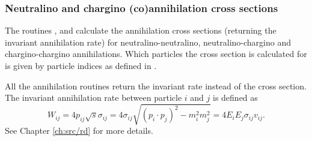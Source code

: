 \subsubsection{Neutralino and chargino (co)annihilation cross sections}
                                   
The routines ,  and 
calculate the annihilation cross sections (returning the invariant 
annihilation rate) for neutralino-neutralino, neutralino-chargino and
chargino-chargino annihilations. Which particles the cross section is
calculated for is given by particle indices as defined in .

All the annihilation routines return the invariant rate instead of the
cross section. The invariant annihilation rate between particle $i$
and $j$ is defined as 
\begin{equation}
  W_{ij} = 4 p_{ij} \sqrt{s} \sigma_{ij} = 4 \sigma_{ij} \sqrt{(p_i
\cdot p_j)^2 - m_i^2 m_j^2} = 4 E_{i} E_{j} \sigma_{ij} v_{ij} .
\end{equation}
See Chapter \ref{ch:src/rd} for more details.
